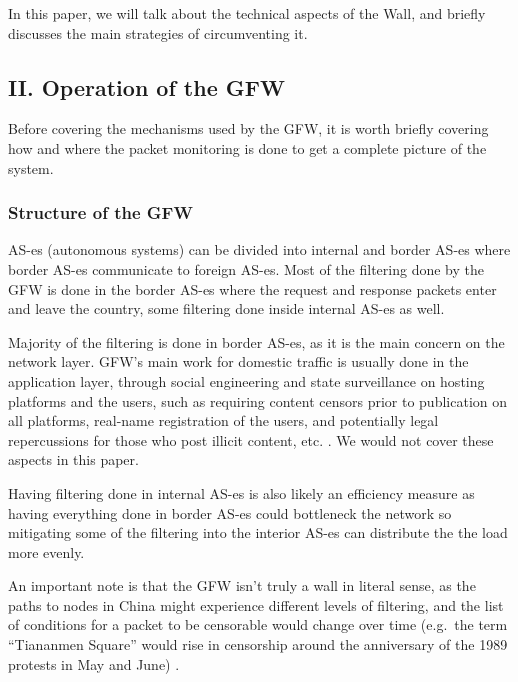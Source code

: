 \documentclass[sigconf]{acmart}
\begin{document}
In this paper, we will talk about the technical aspects of the Wall, and
briefly discusses the main strategies of circumventing it.

\hypertarget{ii.-operation-of-the-gfw}{%
\subsection{II. Operation of the GFW}\label{ii.-operation-of-the-gfw}}

Before covering the mechanisms used by the GFW, it is worth briefly
covering how and where the packet monitoring is done to get a complete
picture of the system.

\hypertarget{structure-of-the-gfw}{%
\subsubsection{Structure of the GFW}\label{structure-of-the-gfw}}

AS-es (autonomous systems) can be divided into internal and border AS-es
where border AS-es communicate to foreign AS-es. Most of the filtering
done by the GFW is done in the border AS-es \cite{03_whereFilter} where
the request and response packets enter and leave the country, some
filtering done inside internal AS-es \cite{03_whereFilter} as well.

Majority of the filtering is done in border AS-es, as it is the main
concern on the network layer. GFW's main work for domestic traffic is
usually done in the application layer, through social engineering and
state surveillance on hosting platforms and the users, such as requiring
content censors prior to publication on all platforms, real-name
registration of the users, and potentially legal repercussions for those
who post illicit content, etc. \cite{04_digitalEco_mypaper}. We would
not cover these aspects in this paper.

Having filtering done in internal AS-es is also likely an efficiency
measure as having everything done in border AS-es could bottleneck the
network so mitigating some of the filtering into the interior AS-es can
distribute the the load more evenly.

An important note is that the GFW isn't truly a wall in literal sense,
as the paths to nodes in China might experience different levels of
filtering, and the list of conditions for a packet to be censorable
would change over time (e.g.~the term ``Tiananmen Square'' would rise in
censorship around the anniversary of the 1989 protests in May and June)
\cite{05_conceptDoppler}.
\end{document}
